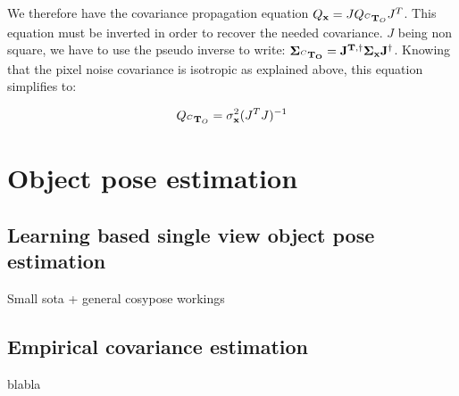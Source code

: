 We therefore have the covariance propagation equation $Q_{{\bf x}} = J Q_{\prescript{C}{}{{\bf T}}_{O}} J^T$. 
This equation must be inverted in order to recover the needed covariance. $J$ being non square, 
we have to use the pseudo inverse to write: $\bf \Sigma_{\prescript{C}{}{{\bf T}}_{O}} = J^{T,\dagger} \bf \Sigma_{{\bf x}} J^{\dagger}$. 
Knowing that the pixel noise covariance is isotropic as explained above, this equation simplifies to:

\begin{equation}
Q_{\prescript{C}{}{{\bf T}}_{O}} = \sigma_{{\bf x}}^2(J^T J)^{-1}    
\end{equation}




\section{Object pose estimation}
\subsection{Learning based single view object pose estimation}
Small sota + general cosypose workings
\subsection{Empirical covariance estimation}
blabla